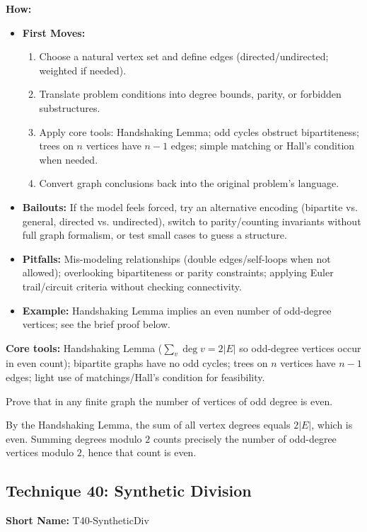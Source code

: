 \documentclass[12pt]{article}
\newenvironment{problem}[1]
{\begin{tcolorbox}[colback=blue!5!white,colframe=blue!75!black,title={#1}]}{\end{tcolorbox}}
\newenvironment{solution}
{\begin{tcolorbox}[colback=green!5!white,colframe=green!75!black,title={Solution}]}{\end{tcolorbox}}
\begin{document}
\textbf{How:}
\begin{itemize}
    \item \textbf{First Moves:}
    \begin{enumerate}[nosep]
        \item Choose a natural vertex set and define edges (directed/undirected; weighted if needed).
        \item Translate problem conditions into degree bounds, parity, or forbidden substructures.
        \item Apply core tools: Handshaking Lemma; odd cycles obstruct bipartiteness; trees on $n$ vertices have $n-1$ edges; simple matching or Hall's condition when needed.
        \item Convert graph conclusions back into the original problem's language.
    \end{enumerate}
    \item \textbf{Bailouts:} If the model feels forced, try an alternative encoding (bipartite vs. general, directed vs. undirected), switch to parity/counting invariants without full graph formalism, or test small cases to guess a structure.
    \item \textbf{Pitfalls:} Mis-modeling relationships (double edges/self-loops when not allowed); overlooking bipartiteness or parity constraints; applying Euler trail/circuit criteria without checking connectivity.
    \item \textbf{Example:} Handshaking Lemma implies an even number of odd-degree vertices; see the brief proof below.
\end{itemize}

\textbf{Core tools:} Handshaking Lemma ($\sum_v \deg v = 2|E|$ so odd-degree vertices occur in even count); bipartite graphs have no odd cycles; trees on $n$ vertices have $n-1$ edges; light use of matchings/Hall's condition for feasibility.

\begin{problem}{Example: Odd-Degree Vertices Come in Pairs}
Prove that in any finite graph the number of vertices of odd degree is even.
\end{problem}

\begin{solution}
By the Handshaking Lemma, the sum of all vertex degrees equals $2|E|$, which is even. Summing degrees modulo $2$ counts precisely the number of odd-degree vertices modulo $2$, hence that count is even.
\end{solution}

\subsection{Technique 40: Synthetic Division}
\textbf{Short Name:} T40-SyntheticDiv
\end{document}
